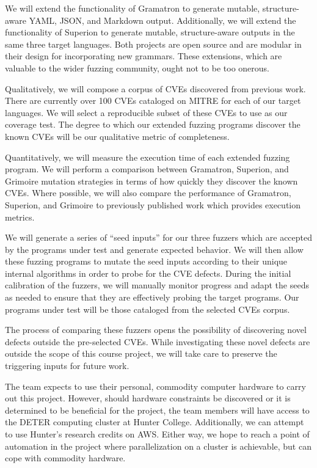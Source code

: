 \documentclass[12pt]{diazessay}
\begin{document}
We will extend the functionality of Gramatron to generate mutable, structure-aware YAML, JSON, and Markdown output.
Additionally, we will extend the functionality of Superion to generate mutable, structure-aware outputs in the same three target languages.
Both projects are open source and are modular in their design for incorporating new grammars.
These extensions, which are valuable to the wider fuzzing community, ought not to be too onerous.

Qualitatively, we will compose a corpus of CVEs discovered from previous work.
There are currently over 100 CVEs cataloged on MITRE\cite{MITRE} for each of our target languages.
We will select a reproducible subset of these CVEs to use as our coverage test.
The degree to which our extended fuzzing programs discover the known CVEs will be our qualitative metric of completeness.

Quantitatively, we will measure the execution time of each extended fuzzing program.
We will perform a comparison between Gramatron, Superion, and Grimoire mutation strategies in terms of how quickly they discover the known CVEs.
Where possible, we will also compare the performance of Gramatron, Superion, and Grimoire to previously published work which provides execution metrics.

We will generate a series of ``seed inputs'' for our three fuzzers which are accepted by the programs under test and generate expected behavior.
We will then allow these fuzzing programs to mutate the seed inputs\cite{Seed} according to their unique internal algorithms in order to probe for the CVE defects.
During the initial calibration of the fuzzers, we will manually monitor progress and adapt the seeds as needed to ensure that they are effectively probing the target programs.
Our programs under test will be those cataloged from the selected CVEs corpus.

The process of comparing these fuzzers opens the possibility of discovering novel defects outside the pre-selected CVEs.
While investigating these novel defects are outside the scope of this course project, we will take care to preserve the triggering inputs for future work.

The team expects to use their personal, commodity computer hardware to carry out this project.
However, should hardware constraints be discovered or it is determined to be beneficial for the project, the team members will have access to the DETER computing cluster at Hunter College.
Additionally, we can attempt to use Hunter's research credits on AWS.
Either way, we hope to reach a point of automation in the project where parallelization on a cluster is achievable, but can cope with commodity hardware.
\end{document}

